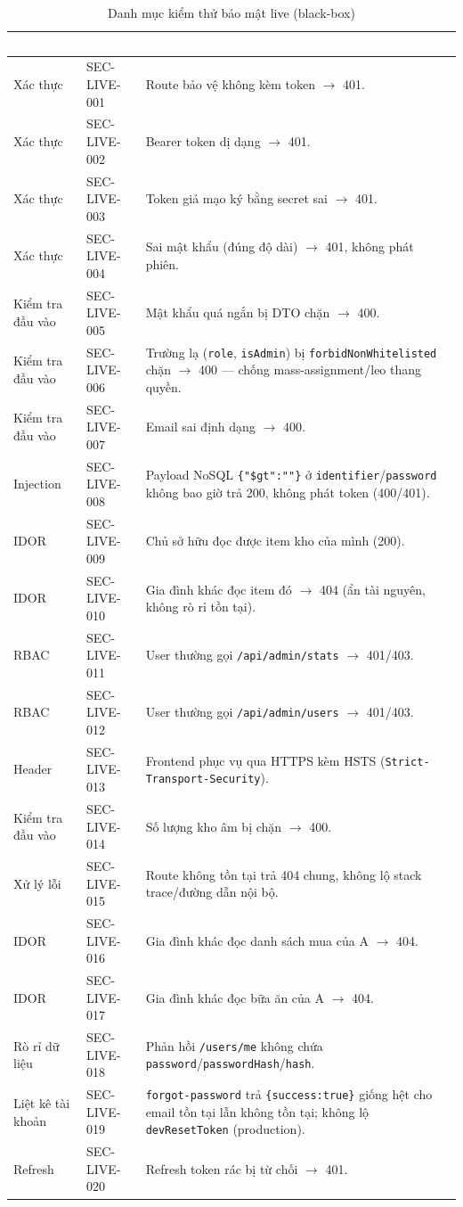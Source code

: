 \documentclass[12pt,a4paper]{article}
\newcommand{\code}[1]{\texttt{#1}}
\newcommand{\thead}[1]{\textbf{\textcolor{white}{#1}}}
\begin{document}
\begin{table}[h]
\centering
\caption{Danh mục kiểm thử bảo mật live (black-box)}
\label{tab:seclive}
\begin{tabularx}{\linewidth}{|l|l|Y|}
\hline
{}
\thead{Nhóm} & \thead{Mã} & \thead{Kịch bản \& kết quả mong đợi} \\
\hline
Xác thực & SEC-LIVE-001 & Route bảo vệ không kèm token $\to$ 401. \\
\hline
Xác thực & SEC-LIVE-002 & Bearer token dị dạng $\to$ 401. \\
\hline
Xác thực & SEC-LIVE-003 & Token giả mạo ký bằng secret sai $\to$ 401. \\
\hline
Xác thực & SEC-LIVE-004 & Sai mật khẩu (đúng độ dài) $\to$ 401, không phát phiên. \\
\hline
Kiểm tra đầu vào & SEC-LIVE-005 & Mật khẩu quá ngắn bị DTO chặn $\to$ 400. \\
\hline
Kiểm tra đầu vào & SEC-LIVE-006 & Trường lạ (\code{role}, \code{isAdmin}) bị \code{forbidNonWhitelisted} chặn $\to$ 400 --- chống mass-assignment/leo thang quyền. \\
\hline
Kiểm tra đầu vào & SEC-LIVE-007 & Email sai định dạng $\to$ 400. \\
\hline
Injection & SEC-LIVE-008 & Payload NoSQL \code{\{"\$gt":""\}} ở \code{identifier}/\code{password} không bao giờ trả 200, không phát token (400/401). \\
\hline
IDOR & SEC-LIVE-009 & Chủ sở hữu đọc được item kho của mình (200). \\
\hline
IDOR & SEC-LIVE-010 & Gia đình khác đọc item đó $\to$ 404 (ẩn tài nguyên, không rò rỉ tồn tại). \\
\hline
RBAC & SEC-LIVE-011 & User thường gọi \code{/api/admin/stats} $\to$ 401/403. \\
\hline
RBAC & SEC-LIVE-012 & User thường gọi \code{/api/admin/users} $\to$ 401/403. \\
\hline
Header & SEC-LIVE-013 & Frontend phục vụ qua HTTPS kèm HSTS (\code{Strict-Transport-Security}). \\
\hline
Kiểm tra đầu vào & SEC-LIVE-014 & Số lượng kho âm bị chặn $\to$ 400. \\
\hline
Xử lý lỗi & SEC-LIVE-015 & Route không tồn tại trả 404 chung, không lộ stack trace/đường dẫn nội bộ. \\
\hline
IDOR & SEC-LIVE-016 & Gia đình khác đọc danh sách mua của A $\to$ 404. \\
\hline
IDOR & SEC-LIVE-017 & Gia đình khác đọc bữa ăn của A $\to$ 404. \\
\hline
Rò rỉ dữ liệu & SEC-LIVE-018 & Phản hồi \code{/users/me} không chứa \code{password}/\code{passwordHash}/\code{hash}. \\
\hline
Liệt kê tài khoản & SEC-LIVE-019 & \code{forgot-password} trả \code{\{success:true\}} giống hệt cho email tồn tại lẫn không tồn tại; không lộ \code{devResetToken} (production). \\
\hline
Refresh & SEC-LIVE-020 & Refresh token rác bị từ chối $\to$ 401. \\
\hline
\end{tabularx}
\end{table}
\end{document}
